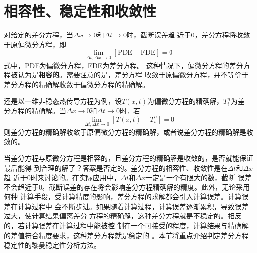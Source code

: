 \section{相容性、稳定性和收敛性}
对给定的差分方程，当$\Delta x \rightarrow 0$和$\Delta t \rightarrow 0$时，截断误差趋
近于0，差分方程将收敛于原偏微分方程，即
\begin{equation}
  \lim_{\Delta t,\Delta x\rightarrow 0}[\mathrm{PDE} - \mathrm{FDE}] = 0
\end{equation}
式中，PDE为偏微分方程，FDE为差分方程。
这种情况下，偏微分方程的差分方程被认为是\textbf{相容的}。需要注意的是，差分方程
收敛于原偏微分方程，并不等价于差分方程的精确解收敛于偏微分方程的精确解。

还是以一维非稳态热传导方程为例，设$T(x,t)$为偏微分方程的精确解，$T_{i}^{n}$为差
分方程的精确解。当$\Delta x \rightarrow 0$和$\Delta t \rightarrow 0$时，若
\begin{equation}
  \lim_{\Delta t,\Delta x\rightarrow 0}[T(x,t) - T_{i}^{n}] = 0
\end{equation}
则差分方程的精确解收敛于原偏微分方程的精确解，或者说差分方程的精确解是收敛的。

当差分方程与原微分方程是相容的，且差分方程的精确解是收敛的，是否就能保证最后能得
到合理的解了？答案是否定的。差分方程的相容性、收敛性是在$\Delta t$和$\Delta x$趋
近于0时来讨论的。在实际应用中，$\Delta t$和$\Delta x$一定是一个有限大的数，截断
误差不会趋近于0。截断误差的存在将会影响差分方程精确解的精度。此外，无论采用何种
计算手段，受计算精度的影响，差分方程的求解都会引入计算误差。计算误差在计算过程中
会不断步进。如果随着计算过程，计算误差逐渐累积，导致误差过大，使计算结果偏离差分
方程的精确解，这种差分方程就是不稳定的。相反的，若计算误差在计算过程中能被控
制在一个可接受的程度，计算结果与精确解的差值符合精度要求，这种差分方程就是稳定的
。本节将重点介绍判定差分方程稳定性的黎曼稳定性分析方法。



